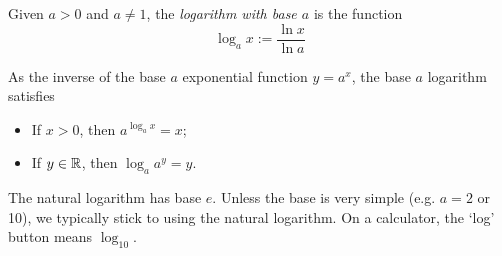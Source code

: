 \begin{defn}{}{}
	Given $a>0$ and $a\neq 1$, the \emph{logarithm with base $a$} is the function
	\[
		\log_ax :=\frac{\ln x}{\ln a}
	\]
\end{defn}

As the inverse of the base $a$ exponential function $y=a^x$, the base $a$ logarithm satisfies
\begin{itemize}
	\item If $x>0$, then $a^{\log_a x}=x$;
	\item If $y\in\mathbb{R}$, then $\log_a a^y=y$.
\end{itemize}
The natural logarithm has base $e$. Unless the base is very simple (e.g.{} $a=2$ or 10), we typically stick to using the natural logarithm. On a calculator, the `log' button means $\log_{10}$.





